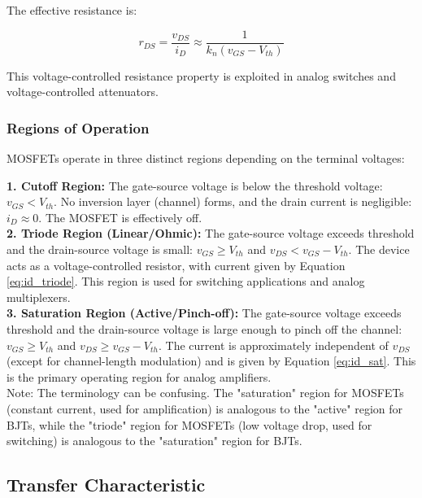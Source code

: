 \documentclass[10pt]{article}
\begin{document}
The effective resistance is:

\begin{equation}
    r_{DS} = \frac{v_{DS}}{i_D} \approx \frac{1}{k_n (v_{GS} - V_{th})}
    \label{eq:rds}
\end{equation}

This voltage-controlled resistance property is exploited in analog switches and voltage-controlled attenuators.

\subsubsection{Regions of Operation}

MOSFETs operate in three distinct regions depending on the terminal voltages:

\textbf{1. Cutoff Region:} The gate-source voltage is below the threshold voltage:  $v_{GS} < V_{th}$. No inversion layer (channel) forms, and the drain current is negligible:  $i_D \approx 0$. The MOSFET is effectively off. \\

\textbf{2. Triode Region (Linear/Ohmic):} The gate-source voltage exceeds threshold and the drain-source voltage is small: $v_{GS} \geq V_{th}$ and $v_{DS} < v_{GS} - V_{th}$. The device acts as a voltage-controlled resistor, with current given by Equation \ref{eq:id_triode}. This region is used for switching applications and analog multiplexers. \\

\textbf{3. Saturation Region (Active/Pinch-off):} The gate-source voltage exceeds threshold and the drain-source voltage is large enough to pinch off the channel: $v_{GS} \geq V_{th}$ and $v_{DS} \geq v_{GS} - V_{th}$. The current is approximately independent of $v_{DS}$ (except for channel-length modulation) and is given by Equation \ref{eq:id_sat}. This is the primary operating region for analog amplifiers. \\

Note: The terminology can be confusing. The "saturation" region for MOSFETs (constant current, used for amplification) is analogous to the "active" region for BJTs, while the "triode" region for MOSFETs (low voltage drop, used for switching) is analogous to the "saturation" region for BJTs. \\

\subsection{Transfer Characteristic}
\end{document}
